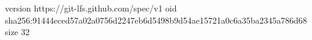 version https://git-lfs.github.com/spec/v1
oid sha256:91444eced57a02a0756d2247eb6d5498b9d54ae15721a0c6a35ba2345a786d68
size 32
